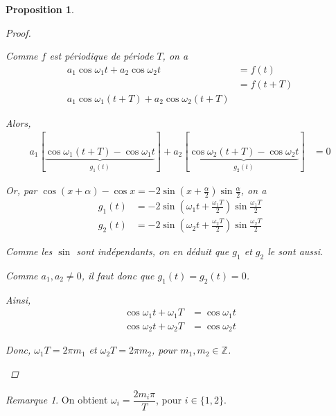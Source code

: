 \documentclass{report}
\newcommand*{\entiers}{\mathbb{Z}}
\newtheorem*{prop}{Proposition}
\theoremstyle{definition}
\theoremstyle{remark}
\newtheorem*{rema}{Remarque}
\begin{document}
\begin{prop}
\begin{proof}
\begin{itemize}
				Comme $f$ est p\'eriodique de p\'eriode $T$, on a
				\begin{align*}
					a_1\cos\omega_1t+a_2\cos\omega_2t&= f(t)\\
					&= f(t+T)\\
					a_1\cos\omega_1(t+T)+a_2\cos\omega_2(t+T)
				\end{align*}

				Alors,
				\begin{align*}
					a_1\left[ \underbrace{\cos\omega_1(t+T) - \cos\omega_1t}_{g_1(t)} \right] + a_2\left[ \underbrace{\cos\omega_2(t+T) - \cos\omega_2t}_{g_2(t)} \right]&= 0
				\end{align*}

				Or, par $\cos(x+\alpha)-\cos x = -2\sin\left( x+\frac{\alpha}{2} \right)\sin\frac{\alpha}{2}$, on a
				\begin{align*}
					g_1(t) &= -2\sin\left( \omega_1t + \frac{\omega_1T}{2} \right)\sin\frac{\omega_1T}{2}\\
					g_2(t) &= -2\sin\left( \omega_2t + \frac{\omega_2T}{2} \right)\sin\frac{\omega_2T}{2}
				\end{align*}

				Comme les $\sin$ sont ind\'ependants, on en d\'eduit que $g_1$ et $g_2$ le sont aussi.

				Comme $a_1,a_2 \neq 0$, il faut donc que $g_1(t)=g_2(t)=0$.

				Ainsi,
				\begin{align*}
					\cos\omega_1t + \omega_1T&= \cos\omega_1t\\
					\cos\omega_2t + \omega_2T&= \cos\omega_2t
				\end{align*}

				Donc, $\omega_1T = 2\pi m_1$ et $\omega_2T = 2\pi m_2$, pour $m_1, m_2 \in \entiers$.
			\end{itemize}
		\end{proof}
	\end{prop}
	\begin{rema}
		On obtient $\omega_i = \dfrac{2m_i\pi}{T}$, pour $i \in \{1,2\}$.
	\end{rema}
\end{document}
